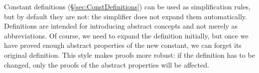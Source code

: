 \begin{isabellebody}
\begin{isamarkuptext}
\end{isamarkuptext}%
\isamarkuptrue%
%
\isamarkuptrue%
%
\begin{isamarkuptext}%
\label{sec:Simp-with-Defs}
Constant definitions (\S\ref{sec:ConstDefinitions}) can be used as
simplification rules, but by default they are not: the simplifier does not
expand them automatically.  Definitions are intended for introducing abstract
concepts and not merely as abbreviations.  Of course, we need to expand
the definition initially, but once we have proved enough abstract properties
of the new constant, we can forget its original definition.  This style makes
proofs more robust: if the definition has to be changed,
only the proofs of the abstract properties will be affected.


\end{isamarkuptext}
\end{isabellebody}
